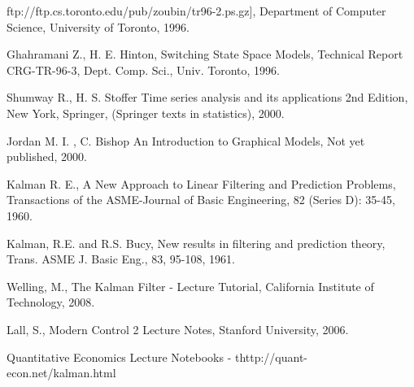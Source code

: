 \documentclass[12pt,fleqn]{article}\usepackage{../common}
\begin{document}
ftp://ftp.cs.toronto.edu/pub/zoubin/tr96-2.ps.gz], Department of Computer
Science, University of Toronto, 1996. 

Ghahramani Z., H. E. Hinton, Switching State Space Models, Technical Report
CRG-TR-96-3, Dept. Comp. Sci., Univ. Toronto, 1996. 

Shumway R., H. S. Stoffer Time series analysis and its applications 2nd
Edition, New York, Springer, (Springer texts in statistics), 2000. 

Jordan M. I. , C. Bishop An Introduction to Graphical Models, Not yet
published, 2000. 

Kalman R. E., A New Approach to Linear Filtering and Prediction Problems,
Transactions of the ASME-Journal of Basic Engineering, 82 (Series D):
35-45, 1960.

Kalman, R.E. and R.S. Bucy, New results in filtering and prediction theory,
Trans. ASME J. Basic Eng., 83, 95-108, 1961. 

Welling, M., The Kalman Filter - Lecture Tutorial, California Institute of
Technology, 2008. 

Lall, S., Modern Control 2 Lecture Notes, Stanford University, 2006.

Quantitative Economics Lecture Notebooks - thttp://quant-econ.net/kalman.html
\end{document}

